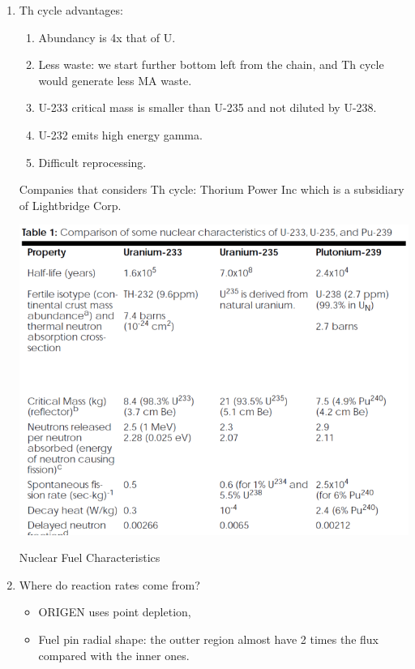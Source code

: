 \documentclass{school-22.211-notes}
\begin{document}
\begin{enumerate}
\item Th cycle advantages: 
\begin{enumerate}
\item Abundancy is 4x that of U. 
\item Less waste: we start further bottom left from the chain, and Th
  cycle would generate less MA waste.
\item U-233 critical mass is smaller than U-235 and not diluted by U-238. 
\item U-232 emits high energy gamma. 
\item Difficult reprocessing. 
\end{enumerate}
Companies that considers Th cycle: Thorium Power Inc which is a
subsidiary of Lightbridge Corp.
\begin{table}
  \centering
  \includegraphics[width=5in]{images/dfs/fuel-type.png}
  \caption{Nuclear Fuel Characteristics} 
\end{table}

\item Where do reaction rates come from? 
  \begin{itemize}
  \item ORIGEN uses point depletion, 
  \item Fuel pin radial shape: the outter region almost have 2 times
    the flux compared with the inner ones.
  \end{itemize}


\end{enumerate}
\end{document}
